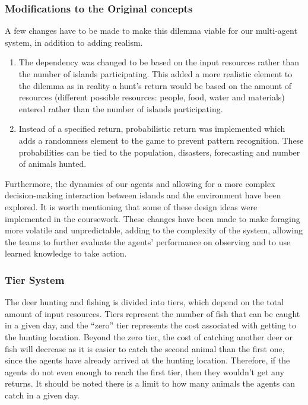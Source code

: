 \subsubsection{Modifications to the Original concepts} 
A few changes have to be made to make this dilemma viable for our multi-agent system, in addition to adding realism. 

\begin{enumerate}
    \item The dependency was changed to be based on the input resources rather than the number of islands participating. This added a more realistic element to the dilemma as in reality a hunt’s return would be based on the amount of resources (different possible resources: people, food, water and materials) entered rather than the number of islands participating.
    \item Instead of a specified return, probabilistic return was implemented which adds a randomness element to the game to prevent pattern recognition. These probabilities can be tied to the population, disasters, forecasting and number of animals hunted.  
\end{enumerate}

Furthermore, the dynamics of our agents and allowing for a more complex decision-making interaction between islands and the environment have been explored. It is worth mentioning that some of these design ideas were implemented in the coursework. These changes have been made to make foraging more volatile and unpredictable, adding to the complexity of the system, allowing the teams to further evaluate the agents’ performance on observing and to use learned knowledge to take action.

\subsubsection{Tier System}

The deer hunting and fishing is divided into tiers, which depend on the total amount of input resources. Tiers represent the number of fish that can be caught in a given day, and the “zero” tier represents the cost associated with getting to the hunting location. Beyond the zero tier, the cost of catching another deer or fish will decrease as it is easier to catch the second animal than the first one, since the agents have already arrived at the hunting location. Therefore, if the agents do not even enough to reach the first tier, then they wouldn't get any returns. It should be noted there is a limit to how many animals the agents can catch in a given day.

